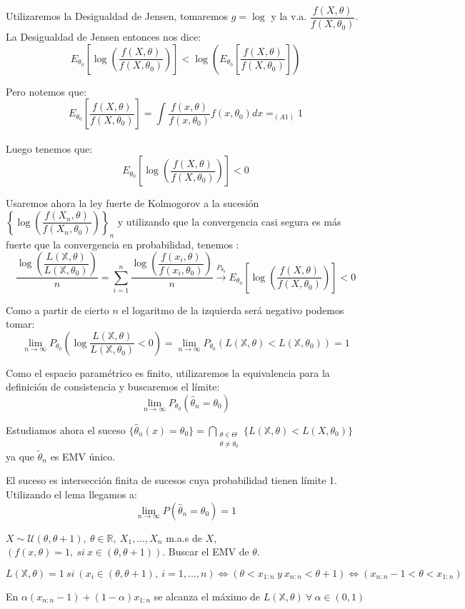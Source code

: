 \documentclass[openany]{book}
\begin{document}
\begin{demonstration}
    Utilizaremos la Desigualdad de Jensen, tomaremos $ g = \log{} $ y la v.a. $ \dfrac{f(X,\theta)}{f(X,\theta_0)} $. La Desigualdad de Jensen entonces nos dice:
    $$ E_{\theta_0}\left[\log{\left(\dfrac{f(X,\theta)}{f(X,\theta_0)}\right)}\right] < \log{\left(  E_{\theta_0}\left[\dfrac{f(X,\theta)}{f(X,\theta_0)}\right]\right)} $$

    Pero notemos que:
    $$   E_{\theta_0}\left[\dfrac{f(X,\theta)}{f(X,\theta_0)}\right] = \int\limits_{}^{} \dfrac{f(x,\theta)}{f(x,\theta_0)}f(x,\theta_0)dx =_{(A1)} 1 $$

    Luego tenemos que:
    $$ E_{\theta_0}\left[\log{\left(\dfrac{f(X,\theta)}{f(X,\theta_0)}\right)}\right] < 0 $$

    Usaremos ahora la ley fuerte de Kolmogorov a la sucesión $ \left\{\log{\left(  \dfrac{f(X_n,\theta)}{f(X_n,\theta_0)}\right)}\right\}_{n} $ y utilizando que la convergencia casi segura es más fuerte que la convergencia en probabilidad, tenemos :
    $$\dfrac{\log{\left( \dfrac{L(\mathbb{X},\theta)}{L(\mathbb{X},\theta_0)} \right)}}{n} =  \sum\limits_{i=1}^{n} \dfrac{\log{\left( \dfrac{f(x_i,\theta)}{f(x_i,\theta_0)} \right)}}{n} \xrightarrow{P_{\theta_0}} E_{\theta_0}\left[\log{\left(\dfrac{f(X,\theta)}{f(X,\theta_0)}\right)}\right] < 0 $$

    Como a partir de cierto $ n $ el logaritmo de la izquierda será negativo podemos tomar:
    $$ \lim_{n \to \infty}P_{\theta_0} \left( \log{ \dfrac{L(\mathbb{X},\theta)}{L(\mathbb{X},\theta_0  )}}<0 \right) = \lim_{n \to \infty}P_{\theta_0} (L(\mathbb{X},\theta)<L(\mathbb{X},\theta_0)) = 1$$

    Como el espacio paramétrico es finito, utilizaremos la equivalencia para la definición de consistencia y buscaremos el límite:
    $$ \lim_{n \to \infty} P_{\theta_0}(\hat{\theta}_{n} = \theta_0 ) $$

    Estudiamos ahora el suceso $ \{\hat{\theta}_{n}(x) = \theta_0\} = \bigcap _{\substack{\theta \in \Theta\\\theta\ne \theta_0}} \{L(\mathbb{X},\theta) < L(X,\theta_0)\} $ ya que $ \widetilde{\theta}_{n}$ es EMV único.

    El suceso es intersección finita de sucesos cuya probabilidad tienen límite 1. Utilizando el lema llegamos a:
    $$ \lim_{n \to \infty}P(\hat{\theta}_{n} = \theta_0 ) = 1 $$
\end{demonstration}


\begin{example}
    $ X \sim \mathcal{U}(\theta,\theta+1),\ \theta \in \mathbb{R},\ X_1,...,X_n$ m.a.s de $ X $, $ (f(x,\theta) = 1,\ si\ x \in (\theta,\theta+1)) $. Buscar el EMV de $ \theta $.

    $$ L(\mathbb{X},\theta) = 1\ si\ (x_i \in (\theta,\theta+1),\ i = 1,...,n) \iff (\theta < x_{1:n}\ y\ x_{n:n}< \theta+1) \iff (x_{n:n}-1 < \theta < x_{1:n}) $$

    En $ \alpha (x_{n:n}-1)+(1-\alpha)x_{1:n} $ se alcanza el máximo de $ L(\mathbb{X},\theta)\ \forall\ \alpha \in (0,1) $
\end{example}
\end{document}
